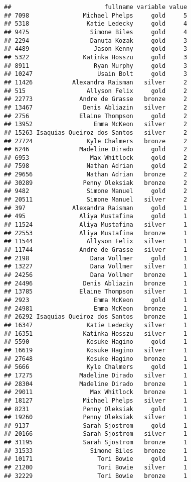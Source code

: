 \documentclass[]{article}
\begin{document}
\begin{verbatim}
##                          fullname variable value
## 7098               Michael Phelps     gold     5
## 5318                Katie Ledecky     gold     4
## 9475                 Simone Biles     gold     4
## 2294                 Danuta Kozak     gold     3
## 4489                  Jason Kenny     gold     3
## 5322               Katinka Hosszu     gold     3
## 8911                  Ryan Murphy     gold     3
## 10247                  Usain Bolt     gold     3
## 11426           Alexandra Raisman   silver     2
## 515                 Allyson Felix     gold     2
## 22773             Andre de Grasse   bronze     2
## 13467              Denis Abliazin   silver     2
## 2756              Elaine Thompson     gold     2
## 13952                 Emma McKeon   silver     2
## 15263 Isaquias Queiroz dos Santos   silver     2
## 27724               Kyle Chalmers   bronze     2
## 6246              Madeline Dirado     gold     2
## 6953                 Max Whitlock     gold     2
## 7598                Nathan Adrian     gold     2
## 29656               Nathan Adrian   bronze     2
## 30289              Penny Oleksiak   bronze     2
## 9482                Simone Manuel     gold     2
## 20511               Simone Manuel   silver     2
## 397             Alexandra Raisman     gold     1
## 495               Aliya Mustafina     gold     1
## 11524             Aliya Mustafina   silver     1
## 22553             Aliya Mustafina   bronze     1
## 11544               Allyson Felix   silver     1
## 11744             Andre de Grasse   silver     1
## 2198                 Dana Vollmer     gold     1
## 13227                Dana Vollmer   silver     1
## 24256                Dana Vollmer   bronze     1
## 24496              Denis Abliazin   bronze     1
## 13785             Elaine Thompson   silver     1
## 2923                  Emma McKeon     gold     1
## 24981                 Emma McKeon   bronze     1
## 26292 Isaquias Queiroz dos Santos   bronze     1
## 16347               Katie Ledecky   silver     1
## 16351              Katinka Hosszu   silver     1
## 5590                Kosuke Hagino     gold     1
## 16619               Kosuke Hagino   silver     1
## 27648               Kosuke Hagino   bronze     1
## 5666                Kyle Chalmers     gold     1
## 17275             Madeline Dirado   silver     1
## 28304             Madeline Dirado   bronze     1
## 29011                Max Whitlock   bronze     1
## 18127              Michael Phelps   silver     1
## 8231               Penny Oleksiak     gold     1
## 19260              Penny Oleksiak   silver     1
## 9137               Sarah Sjostrom     gold     1
## 20166              Sarah Sjostrom   silver     1
## 31195              Sarah Sjostrom   bronze     1
## 31533                Simone Biles   bronze     1
## 10171                  Tori Bowie     gold     1
## 21200                  Tori Bowie   silver     1
## 32229                  Tori Bowie   bronze     1
\end{verbatim}
\end{document}
